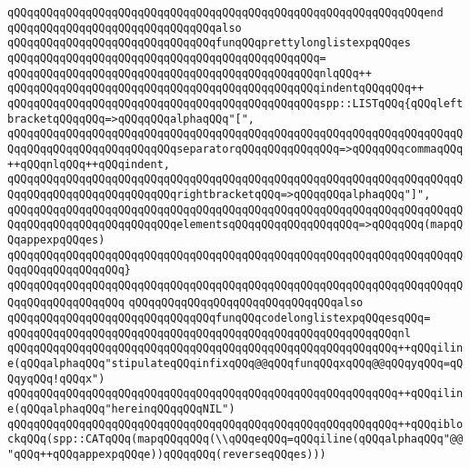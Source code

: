 \verb|qQQqqQQqqQQqqQQqqQQqqQQqqQQqqQQqqQQqqQQqqQQqqQQqqQQqqQQqqQQqqQQqend|\newline
\newline
\verb|qQQqqQQqqQQqqQQqqQQqqQQqqQQqqQQqalso|\newline
\verb|qQQqqQQqqQQqqQQqqQQqqQQqqQQqqQQqfunqQQqprettylonglistexpqQQqes|\newline
\verb|qQQqqQQqqQQqqQQqqQQqqQQqqQQqqQQqqQQqqQQqqQQqqQQq=|\newline
\verb|qQQqqQQqqQQqqQQqqQQqqQQqqQQqqQQqqQQqqQQqqQQqqQQqnlqQQq++|\newline
\verb|qQQqqQQqqQQqqQQqqQQqqQQqqQQqqQQqqQQqqQQqqQQqqQQqindentqQQqqQQq++|\newline
\verb|qQQqqQQqqQQqqQQqqQQqqQQqqQQqqQQqqQQqqQQqqQQqqQQqspp::LISTqQQq{qQQqleftbracketqQQqqQQq=>qQQqqQQqalphaqQQq"[",|\newline
\verb|qQQqqQQqqQQqqQQqqQQqqQQqqQQqqQQqqQQqqQQqqQQqqQQqqQQqqQQqqQQqqQQqqQQqqQQqqQQqqQQqqQQqqQQqqQQqqQQqseparatorqQQqqQQqqQQqqQQq=>qQQqqQQqcommaqQQq++qQQqnlqQQq++qQQqindent,|\newline
\verb|qQQqqQQqqQQqqQQqqQQqqQQqqQQqqQQqqQQqqQQqqQQqqQQqqQQqqQQqqQQqqQQqqQQqqQQqqQQqqQQqqQQqqQQqqQQqqQQqrightbracketqQQq=>qQQqqQQqalphaqQQq"]",|\newline
\verb|qQQqqQQqqQQqqQQqqQQqqQQqqQQqqQQqqQQqqQQqqQQqqQQqqQQqqQQqqQQqqQQqqQQqqQQqqQQqqQQqqQQqqQQqqQQqqQQqelementsqQQqqQQqqQQqqQQqqQQq=>qQQqqQQq(mapqQQqappexpqQQqes)|\newline
\verb|qQQqqQQqqQQqqQQqqQQqqQQqqQQqqQQqqQQqqQQqqQQqqQQqqQQqqQQqqQQqqQQqqQQqqQQqqQQqqQQqqQQqqQQq}|\newline
\verb|qQQqqQQqqQQqqQQqqQQqqQQqqQQqqQQqqQQqqQQqqQQqqQQqqQQqqQQqqQQqqQQqqQQqqQQqqQQqqQQqqQQqqQQq|\newline
\newline
\verb|qQQqqQQqqQQqqQQqqQQqqQQqqQQqqQQqalso|\newline
\verb|qQQqqQQqqQQqqQQqqQQqqQQqqQQqqQQqfunqQQqcodelonglistexpqQQqesqQQq=|\newline
\verb|qQQqqQQqqQQqqQQqqQQqqQQqqQQqqQQqqQQqqQQqqQQqqQQqqQQqqQQqqQQqnl|\newline
\verb|qQQqqQQqqQQqqQQqqQQqqQQqqQQqqQQqqQQqqQQqqQQqqQQqqQQqqQQqqQQq++qQQqiline(qQQqalphaqQQq"stipulateqQQqinfixqQQq@@qQQqfunqQQqxqQQq@@qQQqyqQQq=qQQqyqQQq!qQQqx")|\newline
\verb|qQQqqQQqqQQqqQQqqQQqqQQqqQQqqQQqqQQqqQQqqQQqqQQqqQQqqQQqqQQq++qQQqiline(qQQqalphaqQQq"hereinqQQqqQQqNIL")|\newline
\verb|qQQqqQQqqQQqqQQqqQQqqQQqqQQqqQQqqQQqqQQqqQQqqQQqqQQqqQQqqQQq++qQQqiblockqQQq(spp::CATqQQq(mapqQQqqQQq(\\qQQqeqQQq=qQQqiline(qQQqalphaqQQq"@@"qQQq++qQQqappexpqQQqe))qQQqqQQq(reverseqQQqes)))|\newline
